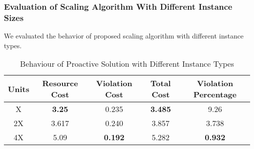 \subsubsection{Evaluation of Scaling Algorithm With Different Instance Sizes}
We evaluated the behavior of proposed scaling algorithm with different instance types.\\

\begin{table}
\caption{Behaviour of Proactive Solution with Different Instance Types}
\centering
\label{dif_instance}
\begin{tabular}{|c|c|c|c|c|}
\hline
Units
& Resource Cost
& Violation Cost
& Total Cost
& Violation Percentage
\\ \hline
X
&\textbf{3.25} 
&0.235
&\textbf{3.485}
&9.26
\\ \hline
2X
&3.617
&0.240
&3.857
&3.738
\\ \hline
4X
&5.09
&\textbf{0.192}
&5.282
&\textbf{0.932}
\\ \hline
\end{tabular}
\end{table}
